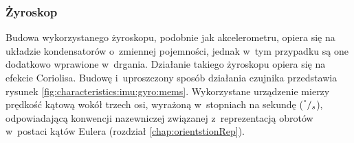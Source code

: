 \subsubsection*{Żyroskop}
Budowa wykorzystanego żyroskopu, podobnie jak akcelerometru, opiera się na układzie kondensatorów o~zmiennej pojemności, jednak w~tym przypadku są one dodatkowo wprawione w~drgania. Działanie takiego żyroskopu opiera się na efekcie Coriolisa{}. Budowę i~uproszczony sposób działania czujnika przedstawia rysunek \ref{fig:characteristics:imu:gyro:mems}. Wykorzystane urządzenie mierzy prędkość kątową wokół trzech osi, wyrażoną w~stopniach na sekundę ($^\degree/_s$), odpowiadającą konwencji nazewniczej związanej z~reprezentacją obrotów w~postaci kątów Eulera (rozdział \ref{chap:orientstionRep}).
																																						
